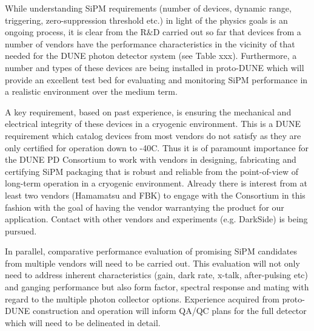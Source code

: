 
While understanding SiPM requirements (number of devices, dynamic range, triggering, 
zero-suppression threshold etc.) in light of the physics goals is an ongoing process, it is clear
from the R$\&$D carried out so far that devices from a number of vendors have the 
performance characteristics in the vicinity of that needed for the DUNE photon detector
system (see Table xxx). Furthermore, a number and types of these devices are being installed in 
proto-DUNE which will provide an excellent test bed for evaluating and monitoring SiPM
performance in a realistic environment over the medium term. 

A key requirement, based on past experience, is ensuring the mechanical and electrical 
integrity of these devices in a cryogenic environment. This is a DUNE requirement which 
catalog devices from most vendors do not satisfy as they are only certified for operation 
down to -40C. Thus it is of paramount importance for the DUNE PD Consortium to work 
with vendors in designing, fabricating and certifying SiPM packaging that is robust and
reliable from the point-of-view of long-term operation in a cryogenic environment. Already 
there is interest from at least two vendors (Hamamatsu and FBK) to engage with the
Consortium in this fashion with the goal of having the vendor warrantying the product
for our application. Contact with other vendors and experiments (e.g. DarkSide) is
being pursued.   

In parallel, comparative performance evaluation of promising SiPM candidates from
multiple vendors will need to be carried out. This evaluation will not only need to
address inherent characteristics (gain, dark rate, x-talk, after-pulsing etc) and ganging 
performance but also form factor, spectral response and mating with regard to the
multiple photon collector options. Experience acquired from proto-DUNE construction
and operation will inform QA/QC plans for the full detector which will need to be
delineated in detail.


